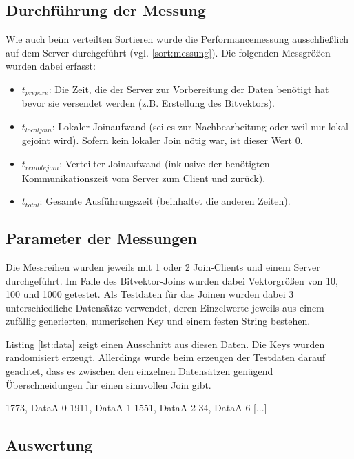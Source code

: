 \documentclass[fontsize=12pt,a4paper,headinclude=no,headings=small]{scrartcl}
\begin{document}
\subsection{Durchführung der Messung}
Wie auch beim verteilten Sortieren wurde die Performancemessung ausschließlich auf dem Server durchgeführt (vgl. \ref{sort:messung}). Die folgenden Messgrößen wurden dabei erfasst:
\begin{itemize}
  \item $t_{prepare}$: Die Zeit, die der Server zur Vorbereitung der Daten benötigt hat bevor sie versendet werden (z.B. Erstellung des Bitvektors).
  \item $t_{localjoin}$: Lokaler Joinaufwand (sei es zur Nachbearbeitung oder weil nur lokal gejoint wird). Sofern kein lokaler Join nötig war, ist dieser Wert 0.
  \item $t_{remotejoin}$: Verteilter Joinaufwand (inklusive der benötigten Kommunikationszeit vom Server zum Client und zurück).
  \item $t_{total}$: Gesamte Ausführungszeit (beinhaltet die anderen Zeiten).
\end{itemize}

\subsection{Parameter der Messungen}
Die Messreihen wurden jeweils mit 1 oder 2 Join-Clients und einem Server durchgeführt. Im Falle des Bitvektor-Joins wurden dabei Vektorgrößen von 10, 100 und 1000 getestet. Als Testdaten für das Joinen wurden dabei 3 unterschiedliche Datensätze verwendet, deren Einzelwerte jeweils aus einem zufällig generierten, numerischen Key und einem festen String bestehen.

Listing \ref{lst:data} zeigt einen Ausschnitt aus diesen Daten. Die Keys wurden randomisiert erzeugt. Allerdings wurde beim erzeugen der Testdaten darauf geachtet, dass es zwischen den einzelnen Datensätzen genügend Überschneidungen für einen sinnvollen Join gibt. 

\begin{code}[label=lst:data,frame=tblr,caption=Auszug aus den Join-Testdaten]
1773, DataA 0
1911, DataA 1
1551, DataA 2
34, DataA 6
[...]
\end{code}

\subsection{Auswertung}
\end{document}
